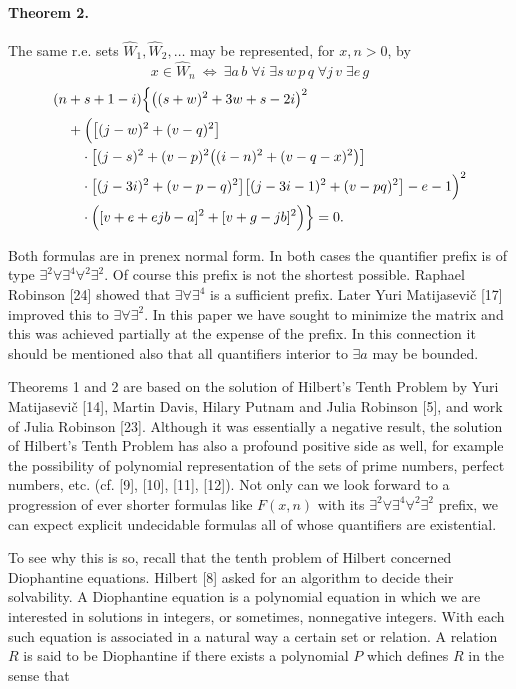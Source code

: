 \documentclass[11pt,a4paper]{article}
\newcommand{\WW}{\widehat W}
\begin{document}
\paragraph{Theorem 2.}
The same r.e. sets $\WW_1,\WW_2,\ldots$ may be represented, for $x,n>0$, by
\[
x\in\WW_n\ \Longleftrightarrow\
\exists a\,b\;\forall i\;\exists s\,w\,p\,q\;\forall j\,v\;\exists e\,g
\]
\[
\begin{aligned}
&(n+s+1-i)\Bigl\{\bigl((s+w)^2+3w+s-2i\bigr)^2\\
&\quad+\Bigl(\bigl[(j-w)^2+(v-q)^2\bigr]\\
&\qquad\cdot\bigl[(j-s)^2+(v-p)^2\bigl((i-n)^2+(v-q-x)^2\bigr)\bigr]\\
&\qquad\cdot\bigl[(j-3i)^2+(v-p-q)^2\bigr]
              \bigl[(j-3i-1)^2+(v-pq)^2\bigr]-e-1\Bigr)^2\\
&\qquad\cdot\Bigl([v+e+ejb-a]^2+[v+g-jb]^2\Bigr)\Bigr\}=0.
\end{aligned}
\]

Both formulas are in prenex normal form. In both cases the quantifier prefix is of type $\exists^{2}\forall\exists^{4}\forall^{2}\exists^{2}$. Of course this prefix is not the shortest possible. Raphael Robinson [24] showed that $\exists \forall \exists^{4}$ is a sufficient prefix. Later Yuri Matijasevič [17] improved this to $\exists\forall\exists^{2}$. In this paper we have sought to minimize the matrix and this was achieved partially at the expense of the prefix. In this connection it should be mentioned also that all quantifiers interior to $\exists a$ may be bounded.

Theorems 1 and 2 are based on the solution of Hilbert's Tenth Problem by Yuri Matijasevič [14], Martin Davis, Hilary Putnam and Julia Robinson [5], and work of Julia Robinson [23]. Although it was essentially a negative result, the solution of Hilbert's Tenth Problem has also a profound positive side as well, for example the possibility of polynomial representation of the sets of prime numbers, perfect numbers, etc. (cf. [9], [10], [11], [12]). Not only can we look forward to a progression of ever shorter formulas like $F(x, n)$ with its $\exists^{2}\forall\exists^{4}\forall^{2}\exists^{2}$ prefix, we can expect explicit undecidable formulas all of whose quantifiers are existential.

To see why this is so, recall that the tenth problem of Hilbert concerned Diophantine equations. Hilbert [8] asked for an algorithm to decide their solvability. A Diophantine equation is a polynomial equation in which we are interested in solutions in integers, or sometimes, nonnegative integers. With each such equation is associated in a natural way a certain set or relation. A relation $R$ is said to be Diophantine if there exists a polynomial $P$ which defines $R$ in the sense that
\end{document}
